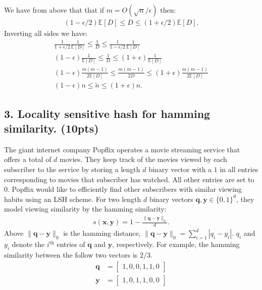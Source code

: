 \documentclass[10pt]{article}
\newcommand{\E}{\mathbb{E}}
\newcommand{\bv}[1]{\mathbf{#1}}
\begin{document}
\begin{enumerate}[label=(\alph*)]
	We have from above that that if $m = O(\sqrt{n}/\epsilon)$ then:
	\begin{align*}
		(1-\epsilon/2)\E[D] \leq D \leq (1+\epsilon/2)\E[D].
	\end{align*}
Inverting all sides we have:
	\begin{align*}
	\frac{1}{1+\epsilon/2}\frac{1}{\E[D]} \leq  \frac{1}{D} \leq \frac{1}{1-\epsilon/2}\frac{1}{\E[D]} \\
	(1-\epsilon) \frac{1}{\E[D]} \leq  \frac{1}{D} \leq (1+\epsilon)  \frac{1}{\E[D]}\\
		(1-\epsilon) \frac{m(m-1)}{2\E[D]} \leq  \frac{m(m-1)}{2D} \leq (1+\epsilon)  \frac{m(m-1)}{2\E[D]}\\ 
		(1-\epsilon)n \leq \tilde{n} \leq (1+\epsilon)n.
\end{align*}
\end{enumerate}


\subsection{3. Locality sensitive hash for hamming similarity. (\textbf{\small 10pts})}
The giant internet company Popflix operates a movie streaming service that offers a total of $d$ movies. They keep track of the movies viewed by each subscriber to the service by storing a length $d$ binary vector with a $1$ in all entries corresponding to movies that subscriber has watched. All other entries are set to $0$. Popflix would like to efficiently find other subscribers with similar viewing habits using an LSH scheme. For two length $d$ binary vectors $\bv{q},\bv{y} \in \{0,1\}^d$, they model viewing similarity by the hamming similarity: 
\begin{align*}
	s(\bv{x},\bv{y}) = 1 - \frac{\|\bv{q} - \bv{y}\|_0}{d}.
\end{align*}
Above $\|\bv{q} - \bv{y}\|_0$ is the hamming distance, $\|\bv{q} - \bv{y}\|_0 = \sum_{i=1}^d |q_i - y_i|$.  $q_i$ and $y_i$ denote the $i^\text{th}$ entries of $\bv{q}$ and $\bv{y}$, respectively. For example, the hamming similarity between the follow two vectors is $2/3$.
\begin{align*}
	\bv{q} &= \begin{bmatrix}1,0,0,1,1,0\end{bmatrix} \\
	\bv{y} &= \begin{bmatrix}1,0,1,1,0,0\end{bmatrix} 
\end{align*}
\end{document}
